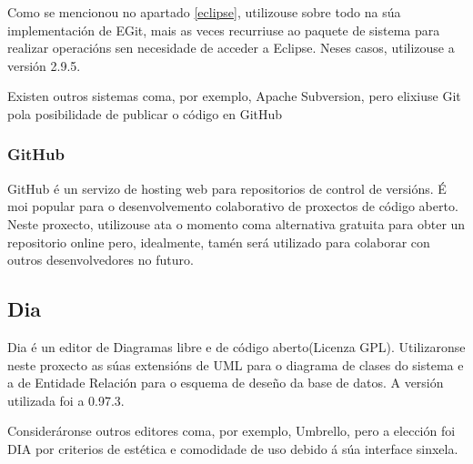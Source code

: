 Como se mencionou no apartado \ref{eclipse}, utilizouse sobre todo na súa implementación de EGit, mais as veces recurriuse ao paquete de sistema para realizar operacións sen necesidade de acceder a Eclipse. Neses casos, utilizouse a versión 2.9.5.

Existen outros sistemas coma, por exemplo, Apache Subversion, pero elixiuse Git pola posibilidade de publicar o código en GitHub

\subsubsection{GitHub}  

GitHub é un servizo de hosting web para repositorios de control de versións. É moi popular para o desenvolvemento colaborativo de proxectos de código aberto. Neste proxecto, utilizouse ata o momento coma alternativa gratuita para obter un repositorio online pero, idealmente, tamén será utilizado para colaborar con outros desenvolvedores no futuro. 


\subsection{Dia}

Dia é un editor de Diagramas libre e de código aberto(Licenza GPL). Utilizaronse neste proxecto as súas extensións de UML para o diagrama de clases do sistema e a de Entidade Relación para o esquema de deseño da base de datos. A versión utilizada foi a 0.97.3.

Consideráronse outros editores coma, por exemplo, Umbrello, pero a elección foi DIA por criterios de estética e comodidade de uso debido á súa interface sinxela.

